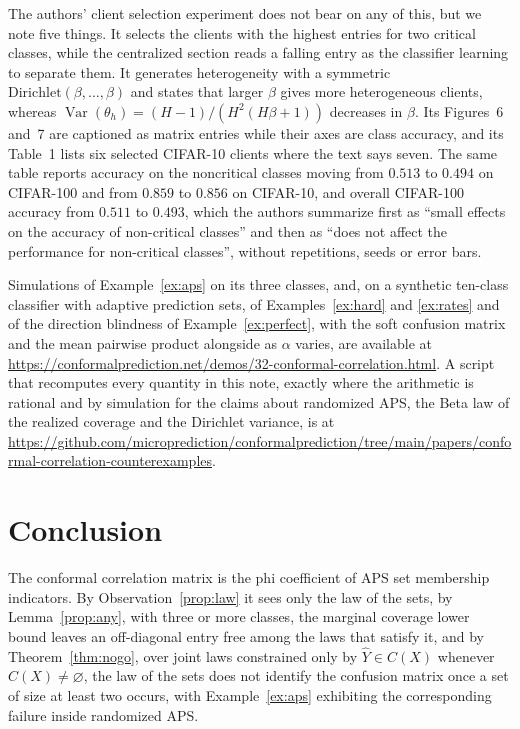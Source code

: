 \documentclass[11pt]{article}
\theoremstyle{definition}
\theoremstyle{definition}
\theoremstyle{remark}
\newcommand{\Var}{\operatorname{Var}}
\begin{document}
The authors' client selection experiment does not bear on any of this, but we note five things.
It selects the clients with the highest entries for two critical classes, while the centralized
section reads a falling entry as the classifier learning to separate them. It generates
heterogeneity with a symmetric $\mathrm{Dirichlet}(\beta, \dots, \beta)$ and states that larger
$\beta$ gives more heterogeneous clients, whereas $\Var(\theta_h) = (H-1)/(H^2(H\beta + 1))$
decreases in $\beta$. Its Figures~6 and~7 are captioned as matrix entries while their axes are class
accuracy, and its Table~1 lists six selected CIFAR-10 clients where the text says seven. The same
table reports accuracy on the noncritical classes moving from $0.513$ to $0.494$ on CIFAR-100 and
from $0.859$ to $0.856$ on CIFAR-10, and overall CIFAR-100 accuracy from $0.511$ to $0.493$, which the authors summarize first as ``small effects on the accuracy of non-critical classes'' and
then as ``does not affect the performance for non-critical classes'', without repetitions, seeds or
error bars.

Simulations of Example~\ref{ex:aps} on its three classes, and, on a synthetic ten-class classifier
with adaptive prediction sets, of Examples~\ref{ex:hard} and \ref{ex:rates} and of the direction
blindness of Example~\ref{ex:perfect}, with the soft confusion matrix and the mean pairwise product
alongside as $\alpha$ varies, are available at
\url{https://conformalprediction.net/demos/32-conformal-correlation.html}. A script that recomputes
every quantity in this note, exactly where the arithmetic is rational and by simulation for the
claims about randomized APS, the Beta law of the realized coverage and the Dirichlet variance, is at
\url{https://github.com/microprediction/conformalprediction/tree/main/papers/conformal-correlation-counterexamples}.

\section{Conclusion}\label{sec:conclusion}

The conformal correlation matrix is the phi coefficient of APS set membership indicators. By
Observation~\ref{prop:law} it sees only the law of the sets, by Lemma~\ref{prop:any}, with three or more classes, the marginal coverage lower bound leaves an
off-diagonal entry free among the laws that satisfy it, and by Theorem~\ref{thm:nogo}, over joint laws constrained only by $\hat Y \in C(X)$ whenever $C(X) \ne \varnothing$, the law of the
sets does not identify the confusion matrix once a set of size at
least two occurs, with Example~\ref{ex:aps} exhibiting the corresponding failure inside randomized
APS.
\end{document}
